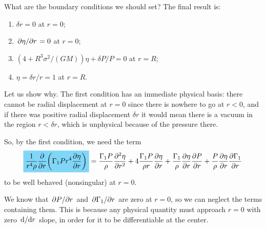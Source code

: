\documentclass[main.tex]{subfiles}
\begin{document}
What are the boundary conditions we should set? The final result is:
%
\begin{enumerate}
    \item \(\delta r = 0\) at \(r = 0\);
    \item \(\pdv*{\eta}{r} = 0 \) at \(r=0\);
    \item \((4 + R^3 \sigma^2 / (GM)) \eta + \delta P / P = 0\) at \(r =R\);
    \item \(\eta = \delta r / r = 1\) at \(r = R\).
\end{enumerate}

Let us show why. The first condition has an immediate physical basis: there cannot be radial displacement at \(r=0\) since there is nowhere to go at \(r<0\), and if there was positive radial displacement \(\delta r\) it would mean there is a vacuum in the region \(r<\delta r \), which is unphysical because of the pressure there.

So, by the first condition, we need the term 
%
\begin{align}
\hlc{cyan}{\frac{1}{r^4 \rho } \pdv{}{r} \qty(\Gamma_1 P r^{4} \pdv{\eta }{r})}
= \frac{\Gamma_1 P}{\rho } \pdv[2]{\eta }{r}
+ 4 \frac{\Gamma_1 P}{\rho r} \pdv{\eta}{r} 
+ \frac{\Gamma_1 }{\rho } \pdv{\eta }{r} \pdv{P}{r}
+ \frac{P}{\rho } \pdv{\eta }{r} \pdv{\Gamma_1}{r}
\,
\end{align}
%
to be well behaved (nonsingular) at \(r=0\). 

We know that \(\pdv*{P}{r}\) and \(\pdv*{\Gamma_1}{r}\) are zero at \(r=0\), so we can neglect the terms containing them. This is because any physical quantity must approach \(r=0\) with zero \(\dv*{}{r}\) slope, in order for it to be differentiable at the center.


\end{document}
